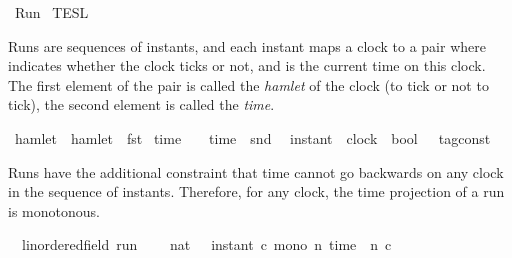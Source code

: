 %
\begin{isabellebody}%
%
%
\isadelimdocument
%
\endisadelimdocument
%
\isatagdocument
%
\isamarkuptrue%
%
\endisatagdocument
{\isafolddocument}%
%
\isadelimdocument
%
\endisadelimdocument
%
\isadelimtheory
%
\endisadelimtheory
%
\isatagtheory
{}\isamarkupfalse%
\ Run\isanewline
{}\ TESL\isanewline
\ \ \ \ \ \ \isanewline
{}%
\endisatagtheory
{\isafoldtheory}%
%
\isadelimtheory
%
\endisadelimtheory
%
\begin{isamarkuptext}%
Runs are sequences of instants, and each instant maps a clock to a pair 
   where  indicates whether the clock ticks or not, 
  and  is the current time on this clock.
  The first element of the pair is called the \emph{hamlet} of the clock (to tick or 
  not to tick), the second element is called the \emph{time}.%
\end{isamarkuptext}\isamarkuptrue%
\isamarkupfalse%
\ hamlet\ \ {\isacartoucheopen}hamlet\ {\isasymequiv}\ fst{\isacartoucheclose}\isanewline
{}\isamarkupfalse%
\ time\ \ \ \ {\isacartoucheopen}time\ {\isasymequiv}\ snd{\isacartoucheclose}\isanewline
\isanewline
{}\isamarkupfalse%
\ {\isacharprime}{\isasymtau}\ instant\ {\isacharequal}\ {\isacartoucheopen}clock\ {\isasymRightarrow}\ {\isacharparenleft}bool\ {\isasymtimes}\ {\isacharprime}{\isasymtau}\ tag{\isacharunderscore}const{\isacharparenright}{\isacartoucheclose}%
\begin{isamarkuptext}%
Runs have the additional constraint that time cannot go backwards on any clock
  in the sequence of instants.
  Therefore, for any clock, the time projection of a run is monotonous.%
\end{isamarkuptext}\isamarkuptrue%
\isamarkupfalse%
\ {\isacharparenleft}\ {\isacharprime}{\isasymtau}{\isacharcolon}{\isacharcolon}linordered{\isacharunderscore}field\ run\ {\isacharequal}\isanewline
\ \ {\isacartoucheopen}{\isacharbraceleft}\ {\isasymrho}{\isacharcolon}{\isacharcolon}nat\ {\isasymRightarrow}\ {\isacharprime}{\isasymtau}\ instant{\isachardot}\ {\isasymforall}c{\isachardot}\ mono\ {\isacharparenleft}{\isasymlambda}n{\isachardot}\ time\ {\isacharparenleft}{\isasymrho}\ n\ c{\isacharparenright}{\isacharparenright}\ {\isacharbraceright}{\isacartoucheclose}\isanewline

\end{isabellebody}
